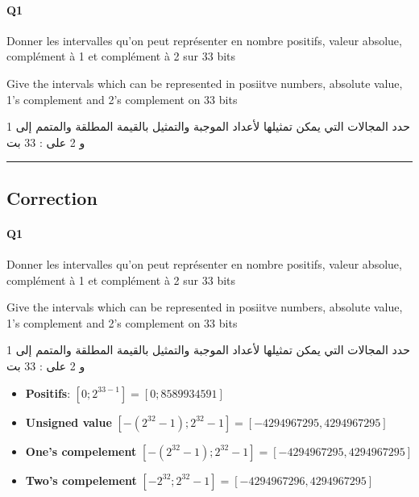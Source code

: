 \pagebreak

\paragraph{Q1}


Donner les intervalles qu'on peut représenter en nombre positifs, valeur absolue, complément à 1 et complément à 2  sur 33 bits


Give the intervals which can be represented in posiitve numbers, absolute value, 1's complement and 2's complement on 33 bits

\begin{arab}[utf]
حدد المجالات التي يمكن تمثيلها لأعداد الموجبة والتمثيل بالقيمة المطلقة والمتمم إلى 1 و 2 على   : 33 بت
\end{arab}




\hrule width 1\linewidth
\pagebreak

\subsection{Correction}


\paragraph{Q1}


Donner les intervalles qu'on peut représenter en nombre positifs, valeur absolue, complément à 1 et complément à 2  sur 33 bits


Give the intervals which can be represented in posiitve numbers, absolute value, 1's complement and 2's complement on 33 bits

\begin{arab}[utf]
حدد المجالات التي يمكن تمثيلها لأعداد الموجبة والتمثيل بالقيمة المطلقة والمتمم إلى 1 و 2 على   : 33 بت
\end{arab}


\begin{itemize}
\item \textbf{Positifs}: $[0; 2^{ 33-1 }] = [0; 8589934591]$
\item \textbf{Unsigned value} $[-(2^{ 32 }-1 );2^{ 32 }-1] = [-4294967295, 4294967295]$
\item \textbf{One's compelement} $[-(2^{ 32 }-1 );2^{ 32 }-1] = [-4294967295, 4294967295]$
\item \textbf{Two's compelement} $[-2^{ 32 } ;2^{ 32 }-1] = [-4294967296, 4294967295]$
\end{itemize}

